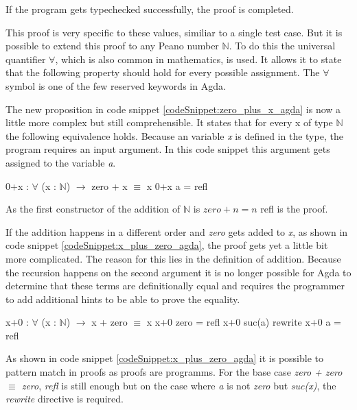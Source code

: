 If the program gets typechecked successfully, the proof is completed.

This proof is very specific to these values, similiar to a single test case. But it is possible to extend this proof to any Peano number $\mathbb{N}$. 
To do this the universal quantifier $\forall$, which is also common in mathematics, is used. It allows it to state that the following property should hold for every possible assignment\cite{plfa2019}.
The $\forall$ symbol is one of the few reserved keywords in Agda.

The new proposition in code snippet \ref{codeSnippet:zero_plus_x_agda} is now a little more complex but still comprehensible. It states that for every x of type $\mathbb{N}$ the following equivalence holds. 
Because an variable \emph{x} is defined in the type, the program requires an input argument. In this code snippet this argument gets assigned to the variable \emph{a}.

\begin{codesnippet}[mathescape=true, caption={Proof of addition to zero in Agda}, label={codeSnippet:zero_plus_x_agda}]
0+x : $\forall$ (x : $\mathbb{N}$) $\rightarrow$ zero + x $\equiv$ x
0+x a = refl
\end{codesnippet}

As the first constructor of the addition of $\mathbb{N}$ is $zero + n = n$ refl is the proof.

If the addition happens in a different order and \emph{zero} gets added to \emph{x}, as shown in code snippet \ref{codeSnippet:x_plus_zero_agda}, the proof gets yet a little bit more complicated. 
The reason for this lies in the definition of addition.
Because the recursion happens on the second argument it is no longer possible for Agda to determine that these terms are definitionally equal and requires the programmer to add additional hints to be able to prove the equality.

\begin{codesnippet}[mathescape=true, caption={Proof of addition of zero in Agda}, label={codeSnippet:x_plus_zero_agda}]
x+0 : $\forall$ (x : $\mathbb{N}$) $\rightarrow$ x + zero $\equiv$ x
x+0 zero = refl
x+0 suc(a) rewrite x+0 a = refl
\end{codesnippet}

As shown in code snippet \ref{codeSnippet:x_plus_zero_agda} it is possible to pattern match in proofs as proofs are programms.
For the base case \emph{zero + zero $\equiv$ zero}, \emph{refl} is still enough but on the case where \emph{a} is not \emph{zero} but \emph{suc(x)}, the \emph{rewrite} directive is required.

